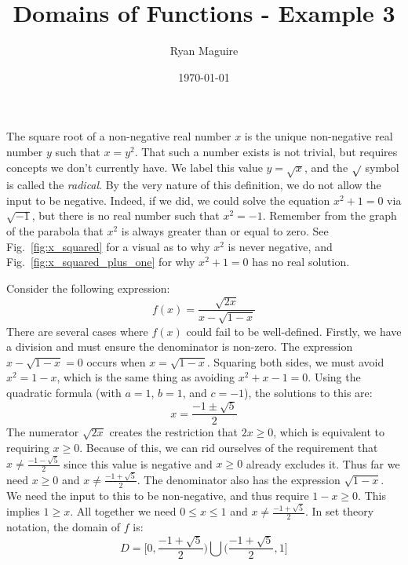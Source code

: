 \documentclass{article}
\title{Domains of Functions - Example 3}
\author{Ryan Maguire}
\date{\today}
\begin{document}
    \maketitle
    The square root of a non-negative real number $x$ is the unique
    non-negative real number $y$ such that $x=y^{2}$. That such a number exists
    is not trivial, but requires concepts we don't currently have. We
    label this value $y=\sqrt{x}$, and the $\sqrt{\empty}$ symbol is called the
    \textit{radical}. By the very nature of this definition, we do not allow
    the input to be negative. Indeed, if we did, we could solve the equation
    $x^{2}+1=0$ via $\sqrt{-1}$, but there is no real number such that
    $x^{2}=-1$. Remember from the graph of the parabola that $x^{2}$ is
    always greater than or equal to zero. See
    Fig.~\ref{fig:x_squared} for a visual as to why $x^{2}$ is never negative,
    and Fig.~\ref{fig:x_squared_plus_one} for why $x^{2}+1=0$ has no real
    solution.
    \par\hfill\par
    Consider the following expression:
    \begin{equation}
        f(x)=\frac{\sqrt{2x}}{x-\sqrt{1-x}}
    \end{equation}
    There are several cases where $f(x)$ could fail to be well-defined. Firstly,
    we have a division and must ensure the denominator is non-zero. The
    expression $x-\sqrt{1-x}=0$ occurs when $x=\sqrt{1-x}$. Squaring both
    sides, we must avoid $x^{2}=1-x$, which is the same thing as avoiding
    $x^{2}+x-1=0$. Using the quadratic formula (with $a=1$, $b=1$, and
    $c=-1$), the solutions to this are:
    \begin{equation}
        x=\frac{-1\pm\sqrt{5}}{2}
    \end{equation}
    The numerator $\sqrt{2x}$ creates the restriction that $2x\geq{0}$, which
    is equivalent to requiring $x\geq{0}$. Because of this, we can rid ourselves
    of the requirement that $x\ne\frac{-1-\sqrt{5}}{2}$ since this value is
    negative and $x\geq{0}$ already excludes it. Thus far we need
    $x\geq{0}$ and $x\ne\frac{-1+\sqrt{5}}{2}$. The denominator also has the
    expression $\sqrt{1-x}$. We need the input to this to be non-negative, and
    thus require $1-x\geq{0}$. This implies $1\geq{x}$. All together we need
    $0\leq{x}\leq{1}$ and $x\ne\frac{-1+\sqrt{5}}{2}$. In set theory notation,
    the domain of $f$ is:
    \begin{equation}
        D=\Big[0,\frac{-1+\sqrt{5}}{2}\Big)\bigcup
        \Big(\frac{-1+\sqrt{5}}{2},1\Big]
    \end{equation}
\end{document}
